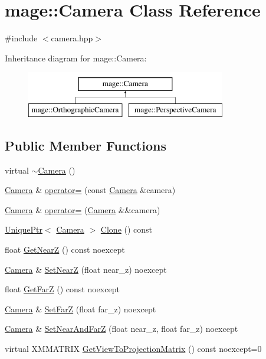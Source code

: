 \hypertarget{classmage_1_1_camera}{}\section{mage\+:\+:Camera Class Reference}
\label{classmage_1_1_camera}


{\ttfamily \#include $<$camera.\+hpp$>$}

Inheritance diagram for mage\+:\+:Camera\+:\begin{figure}[H]
\begin{center}
\leavevmode
\includegraphics[height=2.000000cm]{classmage_1_1_camera}
\end{center}
\end{figure}
\subsection*{Public Member Functions}
\begin{DoxyCompactItemize}
\item 
virtual \hyperlink{classmage_1_1_camera_aa4718c93578d160299bdc24039cc256f}{$\sim$\+Camera} ()
\item 
\hyperlink{classmage_1_1_camera}{Camera} \& \hyperlink{classmage_1_1_camera_a9ae561f9cc0ed0dd855ee1d824dad090}{operator=} (const \hyperlink{classmage_1_1_camera}{Camera} \&camera)
\item 
\hyperlink{classmage_1_1_camera}{Camera} \& \hyperlink{classmage_1_1_camera_a83e33f57394e85eee58745eb8e05b282}{operator=} (\hyperlink{classmage_1_1_camera}{Camera} \&\&camera)
\item 
\hyperlink{namespacemage_a8c307fbcc33bce9b7f2aa4c26c3b95cf}{Unique\+Ptr}$<$ \hyperlink{classmage_1_1_camera}{Camera} $>$ \hyperlink{classmage_1_1_camera_a830e9a071449f1026fd43fcd19577e6c}{Clone} () const
\item 
float \hyperlink{classmage_1_1_camera_a0f969370751ec76c51adf093f7bc092a}{Get\+NearZ} () const noexcept
\item 
\hyperlink{classmage_1_1_camera}{Camera} \& \hyperlink{classmage_1_1_camera_afa88d9ca0e72f661b490b988c12eeb34}{Set\+NearZ} (float near\+\_\+z) noexcept
\item 
float \hyperlink{classmage_1_1_camera_ac4c8e8bbfb16068ab24a90e4a4788d15}{Get\+FarZ} () const noexcept
\item 
\hyperlink{classmage_1_1_camera}{Camera} \& \hyperlink{classmage_1_1_camera_a2643b1e8946767a4b3d139e86b1b913f}{Set\+FarZ} (float far\+\_\+z) noexcept
\item 
\hyperlink{classmage_1_1_camera}{Camera} \& \hyperlink{classmage_1_1_camera_ad31923fb81a727aadd58399e8485fc35}{Set\+Near\+And\+FarZ} (float near\+\_\+z, float far\+\_\+z) noexcept
\item 
virtual X\+M\+M\+A\+T\+R\+IX \hyperlink{classmage_1_1_camera_ad72020c0bd6f8629bf8c8ba8bf583ed4}{Get\+View\+To\+Projection\+Matrix} () const noexcept=0
\end{DoxyCompactItemize}
